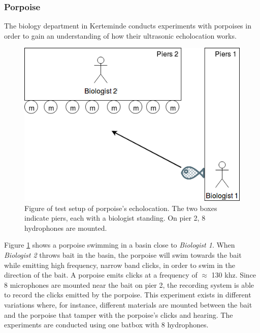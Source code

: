 \subsubsection{Porpoise} \label{sec:usecase:porpoise}
The biology department in Kerteminde conducts experiments with porpoises in order to gain an understanding of how their ultrasonic echolocation works.
\begin{figure}[!h]
    \centering
	\includegraphics[width=\textwidth]{figures/porpoise_experiment1}
	\caption{Figure of test setup of porpoise's echolocation. The two boxes indicate piers, each with a biologist standing. On pier 2, 8 hydrophones are mounted.}\label{usecase:porpoise_experiment1}
\end{figure}


Figure \ref{usecase:porpoise_experiment1} shows a porpoise swimming in a basin close to \textit{Biologist 1}.
When \textit{Biologist 2} throws bait in the basin, the porpoise will swim towards the bait while emitting high frequency, narrow band clicks, in order to swim in the direction of the bait. A porpoise emits clicks at a frequency of $\approx$ 130 khz.
Since 8 microphones are mounted near the bait on pier 2, the recording system is able to record the clicks emitted by the porpoise. This experiment exists in different variations where, for instance, different materials are mounted between the bait and the porpoise that tamper with the porpoise's clicks and hearing. The experiments are conducted using one batbox with 8 hydrophones.

